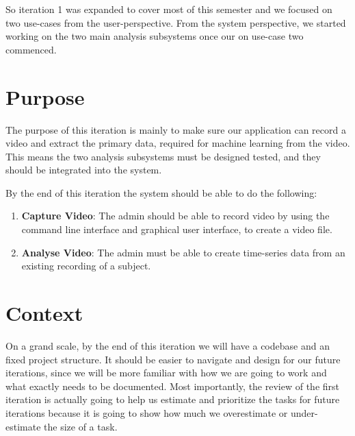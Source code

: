 \documentclass[12pt,a4paper,man]{report}
\begin{document}
So iteration 1 was expanded to cover most of this semester and we focused on two use-cases from the user-perspective. From the system perspective, we started working on the two main analysis subsystems once our on use-case two commenced. 

\section{Purpose}
\label{sec:orgd5af0dc}
The purpose of this iteration is mainly to make sure our application can record a video and extract the primary data, required for machine learning from the video. This means the two analysis subsystems must be designed tested, and they should be integrated into the system.

By the end of this iteration the system should be able to do the following:
\begin{enumerate}
\item \textbf{Capture Video}: The admin should be able to record video by using the command line interface and graphical user interface, to create a video file.
\item \textbf{Analyse Video}: The admin must be able to create time-series data from an existing recording of a subject.
\end{enumerate}


\section{Context}
\label{sec:org94873be}
On a grand scale, by the end of this iteration we will have a codebase and an fixed project structure. It should be easier to navigate and design for our future iterations, since we will be more familiar with how we are going to work and what exactly needs to be documented. Most importantly, the review of the first iteration is actually going to help us estimate and prioritize the tasks for future iterations because it is going to show how much we overestimate or under-estimate the size of a task.
\end{document}
